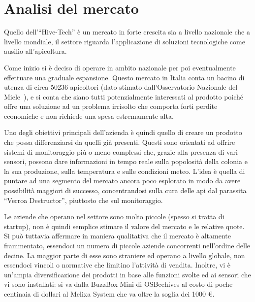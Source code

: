 \section{Analisi del mercato}
Quello dell'``Hive-Tech'' è un mercato in forte crescita sia a livello nazionale
che a livello mondiale, il settore riguarda l’applicazione di soluzioni
tecnologiche come ausilio all’apicoltura.

Come inizio si è deciso di operare in ambito nazionale per poi eventualmente
effettuare una graduale espansione. Questo mercato in Italia conta un bacino di
utenza di circa 50236 apicoltori (dato stimato dall’Osservatorio Nazionale del
Miele~\cite{miele}), e si conta che siano tutti potenzialmente interessati al
prodotto poiché offre una soluzione ad un problema irrisolto che comporta forti
perdite economiche e non richiede una spesa estremamente alta.

Uno degli obiettivi principali dell’azienda è quindi quello di creare un
prodotto che possa differenziarsi da quelli già presenti. Questi sono orientati
ad offrire sistemi di monitoraggio più o meno complessi che, grazie alla
presenza di vari sensori, possono dare informazioni in tempo reale sulla
popolosità della colonia e la sua produzione, sulla temperatura e sulle
condizioni meteo. L’idea è quella di puntare ad una segmento del mercato ancora
poco esplorato in modo da avere possibilità maggiori di successo, concentrandosi
sulla cura delle api dal parassita “Verroa Destructor”, piuttosto che sul
monitoraggio.

Le aziende che operano nel settore sono molto piccole (spesso si tratta di
startup), non è quindi semplice stimare il valore del mercato e le relative
quote. Si può tuttavia affermare in maniera qualitativa che il mercato è
altamente frammentato, essendoci un numero di piccole  aziende concorrenti
nell’ordine delle decine. La maggior parte di esse sono straniere ed operano a
livello globale, non essendoci vincoli o normative che limitino l’attività di
vendita. Inoltre, vi è un’ampia diversificazione dei prodotti in base alle
funzioni svolte ed ai sensori che vi sono installati: si va dalla BuzzBox Mini
di OSBeehives al costo di poche centinaia di dollari al Melixa System che va
oltre la soglia dei 1000 \euro.

